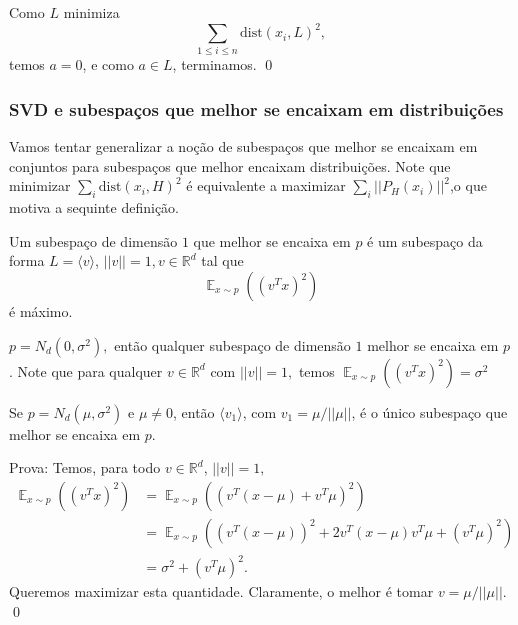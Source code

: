 Como $L$ minimiza 
\[\sum _{1\le i \le n} \text{dist}(x_i,L)^2,\]
temos $a=0$, e como $a\in L$, terminamos. \qed

\subsubsection{SVD e subespa\c{c}os que melhor se encaixam em distribui\c{c}\~oes}
Vamos tentar generalizar a no\c{c}\~ao de subespa\c{c}os que melhor se encaixam em conjuntos para subespa\c{c}os que melhor encaixam distribui\c{c}\~oes. Note que minimizar $\displaystyle\sum_{i} \text{dist}(x_i,H)^2$ \'e equivalente a maximizar $\displaystyle\sum_{i} \vert\vert P_H(x_i)\vert\vert^2$,o que motiva a sequinte defini\c{c}\~ao.

\begin{definicao}
Um subespa\c{c}o de dimens\~ao $1$ que melhor se encaixa em $p$ \'e um subespa\c{c}o da forma $L = \langle v \rangle$, $\vert\vert v \vert\vert = 1, v \in \mathbb{R}^d$ tal que 
\[\displaystyle \mathop{\mathbb{E}}_{x \sim p} \left((v^Tx)^2\right)\]
\'e m\'aximo.
\end{definicao}

\begin{exemplo}
$p = N_d(0,\sigma^2),$ ent\~ao qualquer subespa\c{c}o de dimens\~ao $1$ melhor se encaixa em $p$. Note que para qualquer $v\in \mathbb{R}^d$ com $\vert\vert v \vert\vert=1,$ temos  $\displaystyle \mathop{\mathbb{E}}_{x \sim p} \left((v^Tx)^2\right) = \sigma^2$
\end{exemplo}

\begin{lema}
Se $p = N_d(\mu,\sigma^2)$ e $\mu \neq 0$, ent\~ao $\langle v_1 \rangle$, com $v_1 = \mu/ \vert\vert \mu \vert \vert$, \'e o \'unico subespa\c{c}o que melhor se encaixa em $p$.
\end{lema}
Prova: Temos, para todo $v \in \mathbb{R}^d$, $\vert\vert v \vert \vert =1,$
\begin{align*}
\displaystyle \mathop{\mathbb{E}}_{x \sim p} \left((v^Tx)^2\right) &= \displaystyle \mathop{\mathbb{E}}_{x \sim p} \left((v^T(x-\mu) + v^T\mu)^2\right)\\
																   &= \displaystyle \mathop{\mathbb{E}}_{x \sim p} \left((v^T(x- \mu))^2 + 2v^T(x-\mu)v^T\mu + (v^T\mu)^2\right)\\
																   &= \sigma^2 + (v^T\mu)^2.			   
\end{align*}
Queremos maximizar esta quantidade. Claramente, o melhor \'e tomar $v = \mu/\vert\vert\mu\vert\vert$. \qed

